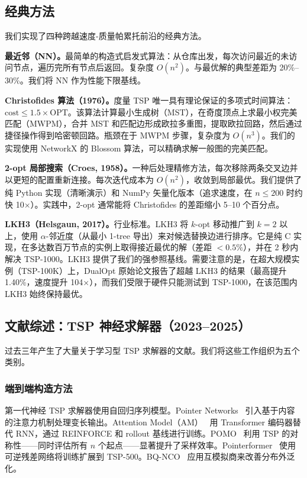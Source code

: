 \documentclass[11pt,a4paper]{ctexart}
\begin{document}
\subsection{经典方法}

我们实现了四种跨越速度-质量帕累托前沿的经典方法。

\textbf{最近邻（NN）。}最简单的构造式启发式算法：从仓库出发，每次访问最近的未访问节点，遍历完所有节点后返回。复杂度 $O(n^2)$。与最优解的典型差距为 20\%--30\%。我们将 NN 作为性能下限基线。

\textbf{Christofides 算法（1976）。}度量 TSP 唯一具有理论保证的多项式时间算法：$\text{cost} \leq 1.5 \times \text{OPT}$。该算法计算最小生成树（MST），在奇度顶点上求最小权完美匹配（MWPM），合并 MST 和匹配边形成欧拉多重图，提取欧拉回路，然后通过捷径操作得到哈密顿回路。瓶颈在于 MWPM 步骤，复杂度为 $O(n^3)$。我们的实现使用 NetworkX 的 Blossom 算法，可以精确求解一般图的完美匹配。

\textbf{2-opt 局部搜索（Croes, 1958）。}一种后处理精修方法，每次移除两条交叉边并以更短的配置重新连接。每次迭代成本为 $O(n^2)$，收敛到局部最优。我们提供了纯 Python 实现（清晰演示）和 NumPy 矢量化版本（追求速度，在 $n \leq 200$ 时约快 10$\times$）。实践中，2-opt 通常能将 Christofides 的差距缩小 5--10 个百分点。

\textbf{LKH3（Helsgaun, 2017）。}行业标准。LKH3 将 $k$-opt 移动推广到 $k=2$ 以上，使用 $\alpha$-邻近度（从最小 1-tree 导出）来对候选替换边进行排序。它是纯 C 实现，在多达数百万节点的实例上取得接近最优的解（差距 $<0.5\%$），并在 2 秒内解决 TSP-1000。LKH3 提供了我们的强参照基线。需要注意的是，在超大规模实例（TSP-100K）上，DualOpt 原始论文报告了超越 LKH3 的结果（最高提升 1.40\%，速度提升 104$\times$），而我们受限于硬件只能测试到 TSP-1000，在该范围内 LKH3 始终保持最优。

\subsection{文献综述：TSP 神经求解器（2023--2025）}

过去三年产生了大量关于学习型 TSP 求解器的文献。我们将这些工作组织为五个类别。

\subsubsection{端到端构造方法}

第一代神经 TSP 求解器使用自回归序列模型。Pointer Networks~\cite{vinyals2015} 引入基于内容的注意力机制处理变长输出。Attention Model（AM）~\cite{kool2019} 用 Transformer 编码器替代 RNN，通过 REINFORCE 和 rollout 基线进行训练。POMO~\cite{kwon2020} 利用 TSP 的对称性——同时评估所有 $n$ 个起点——显著提升了采样效率。Pointerformer~\cite{jin2023} 使用可逆残差网络将训练扩展到 TSP-500。BQ-NCO~\cite{drakulic2023} 应用互模拟商来改善分布外泛化。
\end{document}
